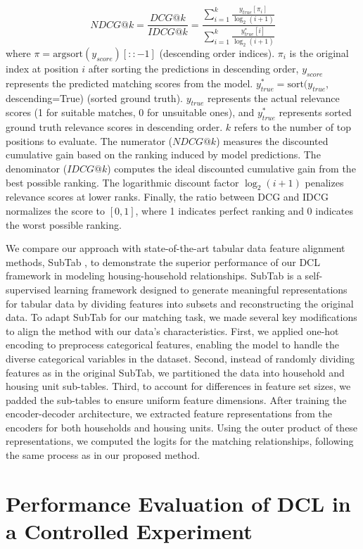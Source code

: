 \documentclass[]{nature_mod}
\begin{document}
\begin{equation}
NDCG@k = \frac{DCG@k}{IDCG@k} = \frac{\sum_{i=1}^k \frac{y_{true}[\pi_i]}{\log_2(i + 1)}}{\sum_{i=1}^k \frac{y_{true}^*[i]}{\log_2(i + 1)}} 
\end{equation}
where $\pi = \text{argsort}(y_{score})[::-1]$ (descending order indices). $\pi_i$ is the original index at position $i$ after sorting the predictions in descending order, $y_{score}$ represents the predicted matching scores from the model. $y_{true}^* = \text{sort}(y_{true}$, descending=True) (sorted ground truth). $y_{true}$ represents the actual relevance scores (1 for suitable matches, 0 for unsuitable ones), and $y_{true}^*$ represents sorted ground truth relevance scores in descending order. $k$ refers to the number of top positions to evaluate. The numerator ($NDCG@k$) measures the discounted cumulative gain based on the ranking induced by model predictions. The denominator ($IDCG@k$) computes the ideal discounted cumulative gain from the best possible ranking. The logarithmic discount factor $\log_2(i + 1)$ penalizes relevance scores at lower ranks. Finally, the ratio between DCG and IDCG normalizes the score to $[0,1]$, where 1 indicates perfect ranking and 0 indicates the worst possible ranking.

We compare our approach with state-of-the-art tabular data feature alignment methods, SubTab \cite{ucar2021subtab}, to demonstrate the superior performance of our DCL framework in modeling housing-household relationships. SubTab is a self-supervised learning framework designed to generate meaningful representations for tabular data by dividing features into subsets and reconstructing the original data. To adapt SubTab for our matching task, we made several key modifications to align the method with our data's characteristics. First, we applied one-hot encoding to preprocess categorical features, enabling the model to handle the diverse categorical variables in the dataset. Second, instead of randomly dividing features as in the original SubTab, we partitioned the data into household and housing unit sub-tables. Third, to account for differences in feature set sizes, we padded the sub-tables to ensure uniform feature dimensions. After training the encoder-decoder architecture, we extracted feature representations from the encoders for both households and housing units. Using the outer product of these representations, we computed the logits for the matching relationships, following the same process as in our proposed method.

\section{Performance Evaluation of DCL in a Controlled Experiment} \label{sec:theoretical_performance}
\end{document}
